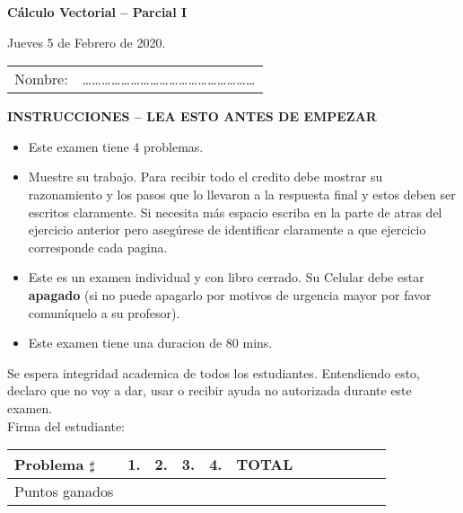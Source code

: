\documentclass[12pt]{article}
\begin{document}
\begin{center}
\begin{Large}
{\bf C\'alculo Vectorial -- Parcial I}\\ 
\end{Large}
{Jueves 5 de Febrero de 2020.}
\bigskip
\\
\begin{tabular}{ll}
Nombre: & \dots\dots\dots\dots\dots\dots\dots\dots\dots\dots\dots\dots\dots\dots\dots\dots\dots\dots\\
\end{tabular}
\bigskip

\begin{large}

\bigskip
{\bf INSTRUCCIONES -- LEA ESTO ANTES DE EMPEZAR}
\end{large}
\end{center}
\begin{itemize}
\item{ Este examen tiene 4 problemas.}
\item{Muestre su trabajo. Para recibir todo el credito debe mostrar su razonamiento y los pasos que lo llevaron a la respuesta final y estos deben ser escritos claramente. Si necesita m\'as espacio escriba en la parte de atras del ejercicio anterior pero aseg\'urese de identificar claramente a que ejercicio corresponde cada pagina.}
\item{Este es un examen individual y con libro cerrado. Su Celular debe estar {\bf apagado} (si no puede apagarlo por motivos de urgencia mayor por favor comun\'iquelo a su profesor).}

\item{Este examen tiene una duracion de 80 mins.}
\end{itemize}
Se espera integridad academica de todos los estudiantes. Entendiendo esto, declaro que no voy a dar, usar o recibir ayuda no autorizada durante este examen.\\
\bigskip
\bigskip
\bigskip
\noindent Firma del estudiante:\\
\hline
\begin{center}
\begin{large}
\bigskip 
\begin{tabular}{|l|c|c|c|c|c|c|c|c|c|c|c}
\hline
Problema $\sharp$ & 1. & 2. & 3. & 4. & TOTAL\\
\hline
Puntos ganados & & & & &\\
\hline 
\end{tabular}
\end{large}
\end{center}
\newpage
\end{document}
